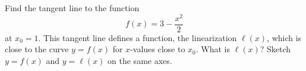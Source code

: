 Find the tangent line to the function
$$f(x)=3 - \frac{x^2}{2}$$
at $x_0 = 1$.  This tangent line defines a function, the linearization $\ell(x)$, which is close to the curve $y=f(x)$ for $x$-values close to $x_0$.  What is $\ell(x)$?  Sketch $y=f(x)$ and $y=\ell(x)$ on the same axes.